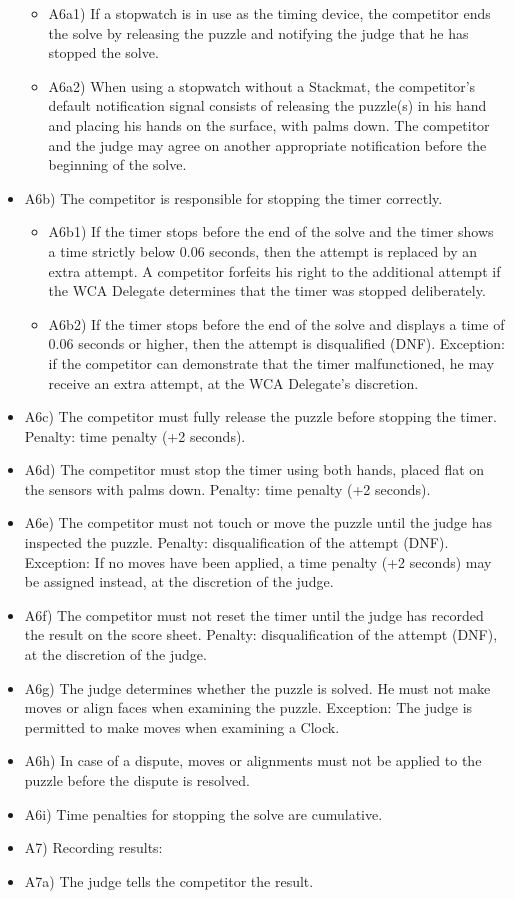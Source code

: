 \begin{itemize}
  \begin{itemize}
  \item
    A6a1) If a stopwatch is in use as the timing device, the competitor
    ends the solve by releasing the puzzle and notifying the judge that
    he has stopped the solve.
  \item
    A6a2) When using a stopwatch without a Stackmat, the competitor's
    default notification signal consists of releasing the puzzle(s) in
    his hand and placing his hands on the surface, with palms down. The
    competitor and the judge may agree on another appropriate
    notification before the beginning of the solve.
  \end{itemize}
\item
  A6b) The competitor is responsible for stopping the timer correctly.

  \begin{itemize}
  \item
    A6b1) If the timer stops before the end of the solve and the timer
    shows a time strictly below 0.06 seconds, then the attempt is
    replaced by an extra attempt. A competitor forfeits his right to the
    additional attempt if the WCA Delegate determines that the timer was
    stopped deliberately.
  \item
    A6b2) If the timer stops before the end of the solve and displays a
    time of 0.06 seconds or higher, then the attempt is disqualified
    (DNF). Exception: if the competitor can demonstrate that the timer
    malfunctioned, he may receive an extra attempt, at the WCA
    Delegate's discretion.
  \end{itemize}
\item
  A6c) The competitor must fully release the puzzle before stopping the
  timer. Penalty: time penalty (+2 seconds).
\item
  A6d) The competitor must stop the timer using both hands, placed flat
  on the sensors with palms down. Penalty: time penalty (+2 seconds).
\item
  A6e) The competitor must not touch or move the puzzle until the judge
  has inspected the puzzle. Penalty: disqualification of the attempt
  (DNF). Exception: If no moves have been applied, a time penalty (+2
  seconds) may be assigned instead, at the discretion of the judge.
\item
  A6f) The competitor must not reset the timer until the judge has
  recorded the result on the score sheet. Penalty: disqualification of
  the attempt (DNF), at the discretion of the judge.
\item
  A6g) The judge determines whether the puzzle is solved. He must not
  make moves or align faces when examining the puzzle. Exception: The
  judge is permitted to make moves when examining a Clock.
\item
  A6h) In case of a dispute, moves or alignments must not be applied to
  the puzzle before the dispute is resolved.
\item
  A6i) Time penalties for stopping the solve are cumulative.
\item
  A7) Recording results:
\item
  A7a) The judge tells the competitor the result.


\end{itemize}
